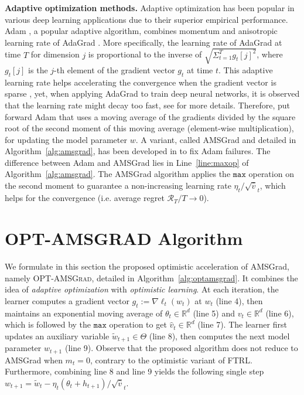 \documentclass[wcp]{jmlr}
\begin{document}
\textbf{Adaptive optimization methods.}\hspace{0.1cm}
Adaptive optimization has been popular in various deep learning applications due to their superior empirical performance.
Adam \citep{KB15}, a popular adaptive algorithm, combines momentum \citep{P64} and anisotropic learning rate of AdaGrad \citep{DHS11}.
More specifically, the learning rate of AdaGrad at time $T$ for dimension $j$ is proportional to the inverse of $\sqrt{ \Sigma_{t=1}^T g_t[j]^2 }$, where $g_t[j]$ is the $j$-th element of the gradient vector $g_t$ at time $t$.
This adaptive learning rate helps accelerating the convergence when the gradient vector is sparse \citep{DHS11}, yet, when applying AdaGrad to train deep neural networks, it is observed that the learning rate might decay too fast, see \citet{KB15} for more details.
Therefore, \cite{KB15} put forward Adam that uses a moving average of the gradients divided by the square root of the second moment of this moving average (element-wise multiplication), for updating the model parameter $w$.
A variant, called AMSGrad and detailed in Algorithm~\ref{alg:amsgrad}, has been developed in \citet{RKK18} to fix Adam failures.
The difference between Adam and AMSGrad lies in Line~\ref{line:maxop} of Algorithm~\ref{alg:amsgrad}.
The AMSGrad algorithm \citep{RKK18} applies the $\texttt{max}$ operation on the second moment to guarantee a non-increasing learning rate $\eta_t / \sqrt{\hat{v}}_t $, which helps for the convergence (i.e. average regret $\mathcal{R}_T/T \rightarrow 0$).


\section{\textsc{OPT-AMSGRAD} Algorithm}\label{sec:opt}
\vspace{-0.05in}





We formulate in this section the proposed optimistic acceleration of AMSGrad, namely \textsc{OPT-AMSGrad}, detailed in Algorithm~\ref{alg:optamsgrad}.  
It combines the idea of \emph{adaptive optimization} with \emph{optimistic learning}. 
At each iteration, the learner computes a gradient vector $g_{t}:= \nabla \ell_t( w_t)$ at $w_{t}$ (line 4), then maintains an exponential moving average of $\theta_{t} \in \mathbb R^{d}$ (line 5) and $v_{t} \in \mathbb R^{d}$ (line 6), which is followed by the $\texttt{max}$ operation to get $\hat{v}_{t} \in \mathbb R^{d}$ (line 7). 
The learner first updates an auxiliary variable $\tilde{w}_{t+1} \in \Theta$ (line 8), then computes the next model parameter $w_{t+1}$ (line 9).
Observe that the proposed algorithm does not reduce to AMSGrad when $m_{t}=0$, contrary to the optimistic variant of FTRL.
Furthermore, combining line 8 and line 9 yields the following single step $w_{t+1}= \tilde{w}_{t}  - \eta_t (\theta_t + h_{t+1} )/ \sqrt{\hat{v}}_t $. 
\end{document}
